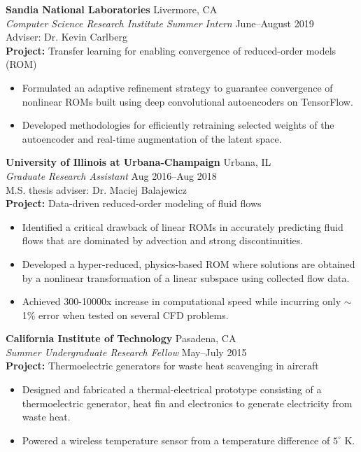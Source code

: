 \documentclass[margin]{res}
\begin{document}
\begin{resume}
{\bf Sandia National Laboratories} \hfill Livermore, CA \\
{\it Computer Science Research Institute Summer Intern} \hfill June--August 2019\\
Adviser: Dr. Kevin Carlberg \\
%
\textbf{Project:} Transfer learning for enabling convergence of reduced-order models (ROM)
\begin{itemize}
\item Formulated an adaptive refinement strategy to guarantee convergence of nonlinear ROMs built using deep convolutional autoencoders on TensorFlow.
\item Developed methodologies for efficiently retraining selected weights of the autoencoder and real-time augmentation of the latent space.
\end{itemize}

{\bf University of Illinois at Urbana-Champaign} \hfill Urbana, IL \\
{\it Graduate Research Assistant} \hfill Aug 2016--Aug 2018\\
M.S. thesis adviser: Dr. Maciej Balajewicz\\
\textbf{Project:} Data-driven reduced-order modeling of fluid flows
\begin{itemize}
	\item Identified a critical drawback of linear ROMs in accurately predicting fluid flows that are dominated by advection and strong discontinuities.
	\item Developed a hyper-reduced, physics-based ROM where solutions are obtained by a nonlinear transformation of a linear subspace using collected flow data.
	\item Achieved 300-10000x increase in computational speed while incurring only $\sim$1\% error when tested on several CFD problems. 
\end{itemize}

{\bf California Institute of Technology} \hfill Pasadena, CA\\
{\it Summer Undergraduate Research Fellow} \hfill May--July 2015\\
\textbf{Project:} Thermoelectric generators for waste heat scavenging in aircraft
\begin{itemize}
	\item Designed and fabricated a thermal-electrical prototype consisting of a thermoelectric generator, heat fin and electronics to generate electricity from waste heat. 
	\item Powered a wireless temperature sensor from a temperature difference of $5^\circ$ K.
\end{itemize}


\end{resume}
\end{document}
